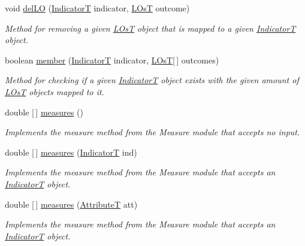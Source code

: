 \begin{DoxyCompactItemize}
void \hyperlink{classsrc_1_1CourseT_af325e1768e2368bb4588f13ac075cd2c}{del\+LO} (\hyperlink{enumsrc_1_1IndicatorT}{IndicatorT} indicator, \hyperlink{classsrc_1_1LOsT}{L\+OsT} outcome)
\begin{DoxyCompactList}\small\item\em Method for removing a given \hyperlink{classsrc_1_1LOsT}{L\+OsT} object that is mapped to a given \hyperlink{enumsrc_1_1IndicatorT}{IndicatorT} object. \end{DoxyCompactList}\item 
boolean \hyperlink{classsrc_1_1CourseT_a98d560017671e680b42c9d781eb9bb5a}{member} (\hyperlink{enumsrc_1_1IndicatorT}{IndicatorT} indicator, \hyperlink{classsrc_1_1LOsT}{L\+OsT}\mbox{[}$\,$\mbox{]} outcomes)
\begin{DoxyCompactList}\small\item\em Method for checking if a given \hyperlink{enumsrc_1_1IndicatorT}{IndicatorT} object exists with the given amount of \hyperlink{classsrc_1_1LOsT}{L\+OsT} objects mapped to it. \end{DoxyCompactList}\item 
double \mbox{[}$\,$\mbox{]} \hyperlink{classsrc_1_1CourseT_aa9abf592dff159aa10f74a7342296351}{measures} ()
\begin{DoxyCompactList}\small\item\em Implements the measure method from the Measure module that accepts no input. \end{DoxyCompactList}\item 
double \mbox{[}$\,$\mbox{]} \hyperlink{classsrc_1_1CourseT_ac81d229c59608e1848f077e9ac61d381}{measures} (\hyperlink{enumsrc_1_1IndicatorT}{IndicatorT} ind)
\begin{DoxyCompactList}\small\item\em Implements the measure method from the Measure module that accepts an \hyperlink{enumsrc_1_1IndicatorT}{IndicatorT} object. \end{DoxyCompactList}\item 
double \mbox{[}$\,$\mbox{]} \hyperlink{classsrc_1_1CourseT_a63d2487bf823e561f12fb06299b23ecd}{measures} (\hyperlink{classsrc_1_1AttributeT}{AttributeT} att)
\begin{DoxyCompactList}\small\item\em Implements the measure method from the Measure module that accepts an \hyperlink{enumsrc_1_1IndicatorT}{IndicatorT} object. \end{DoxyCompactList}\end{DoxyCompactItemize}


